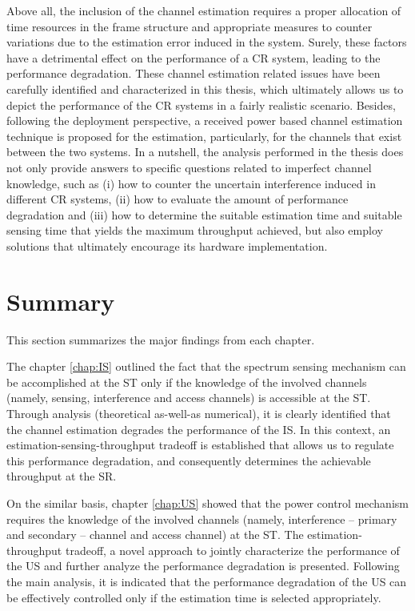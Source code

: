 Above all, the inclusion of the channel estimation requires a proper allocation of time resources in the frame structure and appropriate measures to counter variations due to the estimation error induced in the system. Surely, these factors have a detrimental effect on the performance of a CR system, leading to the performance degradation. These channel estimation related issues have been carefully identified and characterized in this thesis, which ultimately allows us to depict the performance of the CR systems in a fairly realistic scenario. Besides, following the deployment perspective, a received power based channel estimation technique is proposed for the estimation, particularly, for the channels that exist between the two systems. In a nutshell, the analysis performed in the thesis does not only provide answers to specific questions related to imperfect channel knowledge, such as (i) how to counter the uncertain interference induced in different CR systems, (ii) how to evaluate the amount of performance degradation and (iii) how to determine the suitable estimation time and suitable sensing time that yields the maximum throughput achieved, but also employ solutions that ultimately encourage its hardware implementation. 


\section{Summary}
This section summarizes the major findings from each chapter. 

The chapter \ref{chap:IS} outlined the fact that the spectrum sensing mechanism can be accomplished at the ST only if the knowledge of the involved channels (namely, sensing, interference and access channels) is accessible at the ST. Through analysis (theoretical as-well-as numerical), it is clearly identified that the channel estimation degrades the performance of the IS. In this context, an estimation-sensing-throughput tradeoff is established that allows us to regulate this performance degradation, and consequently determines the achievable throughput at the SR.

On the similar basis, chapter \ref{chap:US} showed that the power control mechanism requires the knowledge of the involved channels (namely, interference -- primary and secondary -- channel and access channel) at the ST. The estimation-throughput tradeoff, a novel approach to jointly characterize the performance of the US and further analyze the performance degradation is presented. Following the main analysis, it is indicated that the performance degradation of the US can be effectively controlled only if the estimation time is selected appropriately.   

